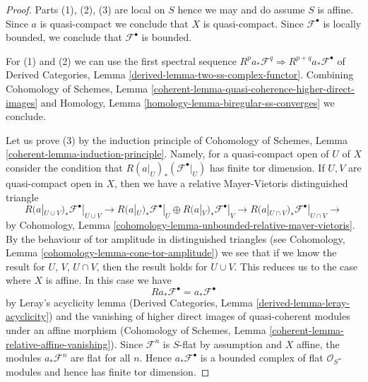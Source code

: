 \begin{proof}

Parts (1), (2), (3) are local on $S$ hence we may and do assume $S$
is affine. Since $a$ is quasi-compact we conclude that $X$ is quasi-compact.
Since $\mathcal{F}^\bullet$ is locally bounded, we conclude that
$\mathcal{F}^\bullet$ is bounded.

\medskip\noindent
For (1) and (2) we can use the first spectral sequence
$R^pa_*\mathcal{F}^q \Rightarrow R^{p + q}a_*\mathcal{F}^\bullet$ of
Derived Categories, Lemma \ref{derived-lemma-two-ss-complex-functor}.
Combining Cohomology of Schemes, Lemma
\ref{coherent-lemma-quasi-coherence-higher-direct-images}
and Homology, Lemma \ref{homology-lemma-biregular-ss-converges}
we conclude.

\medskip\noindent
Let us prove (3) by the induction principle of
Cohomology of Schemes, Lemma \ref{coherent-lemma-induction-principle}.
Namely, for a quasi-compact open of $U$ of $X$ consider the
condition that $R(a|_U)_*(\mathcal{F}^\bullet|_U)$ has
finite tor dimension. If $U, V$ are quasi-compact open in
$X$, then we have a relative Mayer-Vietoris distinguished triangle
$$
R(a|_{U \cup V})_*\mathcal{F}^\bullet|_{U \cup V} \to
R(a|_U)_*\mathcal{F}^\bullet|_U \oplus
R(a|_V)_*\mathcal{F}^\bullet|_V \to
R(a|_{U \cap V})_*\mathcal{F}^\bullet|_{U \cap V} \to
$$
by Cohomology, Lemma \ref{cohomology-lemma-unbounded-relative-mayer-vietoris}.
By the behaviour of tor amplitude in distinguished triangles
(see Cohomology, Lemma \ref{cohomology-lemma-cone-tor-amplitude})
we see that if we know the result for $U$, $V$, $U \cap V$, then
the result holds for $U \cup V$. This reduces us to the case where
$X$ is affine. In this case we have
$$
Ra_*\mathcal{F}^\bullet = a_*\mathcal{F}^\bullet
$$
by Leray's acyclicity lemma
(Derived Categories, Lemma \ref{derived-lemma-leray-acyclicity})
and the vanishing of higher direct images of quasi-coherent modules
under an affine morphism
(Cohomology of Schemes, Lemma \ref{coherent-lemma-relative-affine-vanishing}).
Since $\mathcal{F}^n$ is $S$-flat by assumption and $X$ affine, the modules
$a_*\mathcal{F}^n$ are flat for all $n$. Hence $a_*\mathcal{F}^\bullet$
is a bounded complex of flat $\mathcal{O}_S$-modules and hence has
finite tor dimension.


\end{proof}
